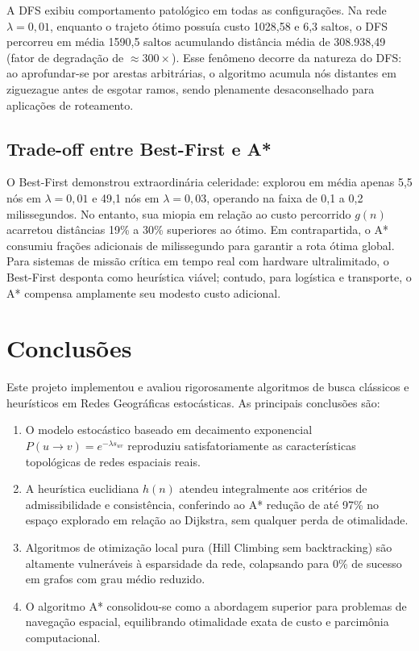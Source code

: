 \documentclass[a4paper,10pt,twocolumn]{article}
\begin{document}
A DFS exibiu comportamento patológico em todas as configurações. Na rede $\lambda = 0{,}01$, enquanto o trajeto ótimo possuía custo 1028{,}58 e 6{,}3 saltos, o DFS percorreu em média 1590{,}5 saltos acumulando distância média de 308.938{,}49 (fator de degradação de $\approx 300\times$). Esse fenômeno decorre da natureza do DFS: ao aprofundar-se por arestas arbitrárias, o algoritmo acumula nós distantes em ziguezague antes de esgotar ramos, sendo plenamente desaconselhado para aplicações de roteamento.

\subsection{Trade-off entre Best-First e A*}

O Best-First demonstrou extraordinária celeridade: explorou em média apenas 5{,}5 nós em $\lambda = 0{,}01$ e 49{,}1 nós em $\lambda = 0{,}03$, operando na faixa de 0{,}1 a 0{,}2 milissegundos. No entanto, sua miopia em relação ao custo percorrido $g(n)$ acarretou distâncias 19\% a 30\% superiores ao ótimo. Em contrapartida, o A* consumiu frações adicionais de milissegundo para garantir a rota ótima global. Para sistemas de missão crítica em tempo real com hardware ultralimitado, o Best-First desponta como heurística viável; contudo, para logística e transporte, o A* compensa amplamente seu modesto custo adicional.

\section{Conclusões}
\label{sec:conclusao}

Este projeto implementou e avaliou rigorosamente algoritmos de busca clássicos e heurísticos em Redes Geográficas estocásticas. As principais conclusões são:
\begin{enumerate}
    \item O modelo estocástico baseado em decaimento exponencial $P(u \to v) = e^{-\lambda s_{uv}}$ reproduziu satisfatoriamente as características topológicas de redes espaciais reais.
    \item A heurística euclidiana $h(n)$ atendeu integralmente aos critérios de admissibilidade e consistência, conferindo ao A* redução de até 97\% no espaço explorado em relação ao Dijkstra, sem qualquer perda de otimalidade.
    \item Algoritmos de otimização local pura (Hill Climbing sem backtracking) são altamente vulneráveis à esparsidade da rede, colapsando para 0\% de sucesso em grafos com grau médio reduzido.
    \item O algoritmo A* consolidou-se como a abordagem superior para problemas de navegação espacial, equilibrando otimalidade exata de custo e parcimônia computacional.
\end{enumerate}
\end{document}
